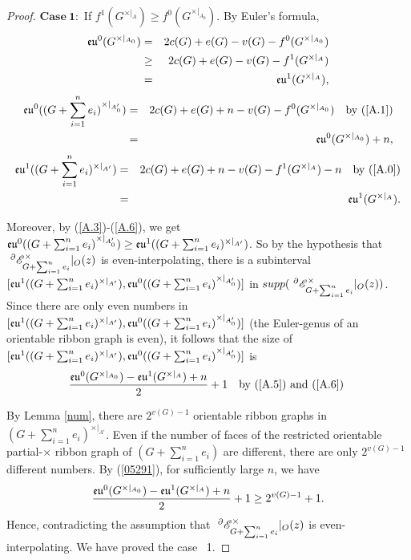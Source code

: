 \begin{proof}
$\mathbf{Case~ 1}:$
 If $f^{1}(G^{\times|_{A}})\geq f^{0}(G^{\times|_{A_{0}}}) $.    By Euler's formula,
  \begin{eqnarray}
   {\mathfrak{eu}}^{0}(G^{\times|_{A_{0}}})&=&2c(G)+e(G)-v(G)- f^{0}(G^{\times|_{A_{0}}})\notag\\
   &\geq& 2c(G)+e(G)-v(G)- f^{1}(G^{\times|_{A}})\notag\\
    &=& {\mathfrak{eu}}^{1}(G^{\times|_{A}}),\label{A.3}
    \end{eqnarray}
    \begin{eqnarray}
    {\mathfrak{eu}}^{0}((G+\sum ^{n}_{i=1}e_{i})^{\times|_{A'_{0}}})
    &=&2c(G)+e(G)+n-v(G)- f^{0}(G^{\times|_{A_{0}}})\quad\text{by (\ref{A.1})}\notag\\
    &=&{\mathfrak{eu}}^{0}(G^{\times|_{A_{0}}})+n,\label{A.5}
     \end{eqnarray}
   \begin{eqnarray}{\mathfrak{eu}}^{1}((G+\sum ^{n}_{i=1}e_{i})^{\times|_{A'}})&=&2c(G)+e(G)+n-v(G)- f^{1}(G^{\times|_{A}})-n\quad\text{by (\ref{A.0})}\notag\\
   &=&{\mathfrak{eu}}^{1}(G^{\times|_{A}}).\label{A.6} \end{eqnarray}


   Moreover,  by (\ref{A.3})-(\ref{A.6}), we get ${\mathfrak{eu}}^{0}((G+\sum ^{n}_{i=1}e_{i})^{\times|_{A'_{0}}}) \geq {\mathfrak{eu}}^{1}((G+\sum ^{n}_{i=1}e_{i})^{\times|_{A'}})$.  So by the hypothesis that $~^{\partial}{{\mathscr{E}}}^{\times}_{G+\sum ^{n}_{i=1}e_{i}}|_O(z)$  is even-interpolating,
   there is a subinterval
   $[{\mathfrak{eu}}^{1}((G+\sum ^{n}_{i=1}e_{i})^{\times|_{A'}}),
   {\mathfrak{eu}}^{0}((G+\sum ^{n}_{i=1}e_{i})^{\times|_{A'_{0}}})]$   in $supp(~^{\partial}{{\mathscr{E}}}^{\times}_{G+\sum ^{n}_{i=1}e_{i}}|_O(z))$. Since there are only even numbers in  $[{\mathfrak{eu}}^{1}((G+\sum ^{n}_{i=1}e_{i})^{\times|_{A'}}),{\mathfrak{eu}}^{0}((G+\sum ^{n}_{i=1}e_{i})^{\times|_{A'_{0}}})]$ (the Euler-genus of an orientable ribbon graph is even), it follows that the size of $[{\mathfrak{eu}}^{1}((G+\sum ^{n}_{i=1}e_{i})^{\times|_{A'}}),
   {\mathfrak{eu}}^{0}((G+\sum ^{n}_{i=1}e_{i})^{\times|_{A'_{0}}})]$ is \begin{eqnarray}\label{05291}
 \frac{{\mathfrak{eu}}^{0}(G^{\times|_{A_{0}}})-{\mathfrak{eu}}^{1}(G^{\times|_{A}})+n}{2}+1 \quad\text{by (\ref{A.5}) and (\ref{A.6}) }
      \end{eqnarray}

       By Lemma \ref{num},
  there are $2^{v(G)-1}$ orientable ribbon graphs   in $(G+\sum ^{n}_{i=1}e_{i})^{\times|_{A'}}$.  Even if the number of faces of  the restricted orientable partial-$\times$ ribbon graph of
  $(G+\sum ^{n}_{i=1}e_{i})$ are different, there are only $2^{v(G)-1}$ different numbers.
By (\ref{05291}), for  sufficiently large $n$,  we have
   $$\frac{{\mathfrak{eu}}^{0}(G^{\times|_{A_{0}}})-{\mathfrak{eu}}^{1}(G^{\times|_{A}})+n}{2}+1\geq 2^{v(G)-1}+1.$$
 Hence, contradicting the assumption that  $~^{\partial}{{\mathscr{E}}}^{\times}_{G+\sum ^{n}_{i=1}e_{i}}|_O(z)$  is   even-interpolating.
 We have proved the case~ 1.



\end{proof}
